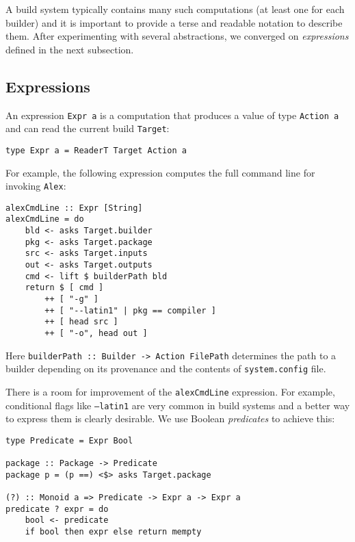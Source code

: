 A build system typically contains many such computations (at least one for each
builder) and it is important to provide a terse and readable notation to
describe them. After experimenting with several abstractions, we converged on
\emph{expressions} defined in the next subsection.

\subsection{Expressions}

An expression \texttt{Expr a} is a computation that produces a value of type
\texttt{Action a} and can read the current build \texttt{Target}:

\begin{lstlisting}[basicstyle=\ttfamily]
type Expr a = ReaderT Target Action a
\end{lstlisting}

For example, the following expression computes the full command line for
invoking \texttt{Alex}:

\begin{lstlisting}[basicstyle=\ttfamily]
alexCmdLine :: Expr [String]
alexCmdLine = do
    bld <- asks Target.builder
    pkg <- asks Target.package
    src <- asks Target.inputs
    out <- asks Target.outputs
    cmd <- lift $ builderPath bld
    return $ [ cmd ]
        ++ [ "-g" ]
        ++ [ "--latin1" | pkg == compiler ]
        ++ [ head src ]
        ++ [ "-o", head out ]
\end{lstlisting}

\noindent Here \texttt{builderPath :: Builder -> Action FilePath} determines the
path to a builder depending on its provenance and the contents of
\texttt{system.config} file.

There is a room for improvement of the \texttt{alexCmdLine} expression. For
example, conditional flags like \texttt{--latin1} are very common in build
systems and a better way to express them is clearly desirable. We use Boolean
\emph{predicates} to achieve this:

\begin{lstlisting}[basicstyle=\ttfamily]
type Predicate = Expr Bool

package :: Package -> Predicate
package p = (p ==) <$> asks Target.package

(?) :: Monoid a => Predicate -> Expr a -> Expr a
predicate ? expr = do
    bool <- predicate
    if bool then expr else return mempty
\end{lstlisting}

